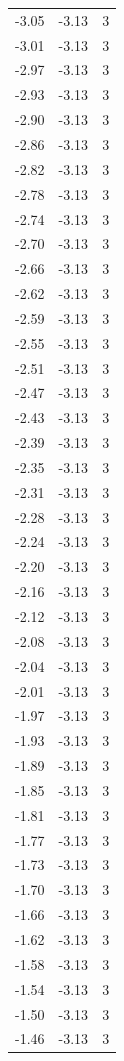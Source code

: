 \begin{longtable}{lrr}
  -3.05 & -3.13 & 3 \\
  -3.01 & -3.13 & 3 \\
  -2.97 & -3.13 & 3 \\
  -2.93 & -3.13 & 3 \\
  -2.90 & -3.13 & 3 \\
  -2.86 & -3.13 & 3 \\
  -2.82 & -3.13 & 3 \\
  -2.78 & -3.13 & 3 \\
  -2.74 & -3.13 & 3 \\
  -2.70 & -3.13 & 3 \\
  -2.66 & -3.13 & 3 \\
  -2.62 & -3.13 & 3 \\
  -2.59 & -3.13 & 3 \\
  -2.55 & -3.13 & 3 \\
  -2.51 & -3.13 & 3 \\
  -2.47 & -3.13 & 3 \\
  -2.43 & -3.13 & 3 \\
  -2.39 & -3.13 & 3 \\
  -2.35 & -3.13 & 3 \\
  -2.31 & -3.13 & 3 \\
  -2.28 & -3.13 & 3 \\
  -2.24 & -3.13 & 3 \\
  -2.20 & -3.13 & 3 \\
  -2.16 & -3.13 & 3 \\
  -2.12 & -3.13 & 3 \\
  -2.08 & -3.13 & 3 \\
  -2.04 & -3.13 & 3 \\
  -2.01 & -3.13 & 3 \\
  -1.97 & -3.13 & 3 \\
  -1.93 & -3.13 & 3 \\
  -1.89 & -3.13 & 3 \\
  -1.85 & -3.13 & 3 \\
  -1.81 & -3.13 & 3 \\
  -1.77 & -3.13 & 3 \\
  -1.73 & -3.13 & 3 \\
  -1.70 & -3.13 & 3 \\
  -1.66 & -3.13 & 3 \\
  -1.62 & -3.13 & 3 \\
  -1.58 & -3.13 & 3 \\
  -1.54 & -3.13 & 3 \\
  -1.50 & -3.13 & 3 \\
  -1.46 & -3.13 & 3 \\

\end{longtable}

